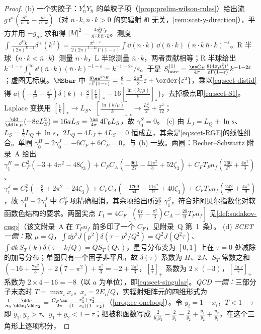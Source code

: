 \begin{proof}
(b) 一个实胶子：$Y_n^\dagger Y_{\bar n}$ 的单胶子项（\cref{prop:prelim-wilson-rules}）给出流 $g\,t^a(\frac{\bar n^\mu}{\bar n\cdot k}-\frac{n^\mu}{n\cdot k})$（对 $n\cdot k,\bar n\cdot k>0$ 的实辐射 $\ii0$ 无关，\cref{rem:scet-y-direction}），平方并用 $-g_{\mu\nu}$ 求和得 $|M|^2=\frac{4g_0^2C_F}{n\cdot k\,\bar n\cdot k}$。测度 $\int\frac{\dd^Dk}{(2\pi)^{D-1}}\delta^+(k^2)=\frac{\pi^{1-\varepsilon}}{2(2\pi)^{3-2\varepsilon}\Gamma(1-\varepsilon)}\int\dd(n\cdot k)\,\dd(\bar n\cdot k)\,(n\cdot k\,\bar n\cdot k)^{-\varepsilon}$。R 半球（$n\cdot k<\bar n\cdot k$）测量 $n\cdot k$，L 半球测量 $\bar n\cdot k$，两者贡献相等；R 半球给出 $k^{-1-\varepsilon}\int_k^\infty\dd(\bar n\cdot k)(\bar n\cdot k)^{-1-\varepsilon}=k^{-1-2\varepsilon}/\varepsilon$。于是 $S^{(1)}_{\rm bare}=\frac{\as C_F}{4\pi}\frac{8(4\pi\mu_0^2)^\varepsilon}{\varepsilon\Gamma(1-\varepsilon)}k^{-1-2\varepsilon}$；虚图无标度。$\MSbar$ 中 $\frac{8\ee^{\varepsilon\gamma_E}}{\varepsilon\Gamma(1-\varepsilon)}=\frac8\varepsilon-\frac{2\pi^2}{3}\varepsilon+\order{\varepsilon^2}$，乘以\cref{eq:scet-distid}得 $a\{(-\frac4{\varepsilon^2}+\frac{\pi^2}3)\delta(k)+\frac8\varepsilon[\frac1k]_*-16[\frac{\ln(k/\mu)}{k}]_*\}$，去掉极点即\cref{eq:scet-S1}。Laplace 变换用 $[\frac1k]_*\to L_S$、$[\frac{\ln(k/\mu)}k]_*\to\frac{L_S^2}2+\frac{\pi^2}{12}$；$\frac{\dd}{\dd\ln\mu}(-8aL_S^2)=16aL_S=\frac{\as}{4\pi}\,4\Gamma_0L_S$，故 $\gamma^S_0=0$。%
(c) 由 $L_J=L_Q+\ln s$、$L_S=\frac12L_Q+\ln s$，$2L_Q-4L_J+4L_S=0$ 恒成立，其余是\cref{eq:scet-RGE}的线性组合。单圈 $\gamma^H_0-2\gamma^J_0=-6C_F+6C_F=0$，与 (b) 一致。两圈：Becher--Schwartz 附录~A 给出\cite{BecherSchwartz2008}
$\gamma^H_1=C_F^2(-3+4\pi^2-48\zeta_3)+C_FC_A(-\frac{961}{27}-\frac{11\pi^2}{3}+52\zeta_3)+C_FT_Fn_f(\frac{260}{27}+\frac{4\pi^2}{3})$、$\gamma^J_1=C_F^2(-\frac32+2\pi^2-24\zeta_3)+C_FC_A(-\frac{1769}{54}-\frac{11\pi^2}{9}+40\zeta_3)+C_FT_Fn_f(\frac{242}{27}+\frac{4\pi^2}{9})$，故 $\gamma^H_1-2\gamma^J_1$ 中 $C_F^2$ 项精确相消，其余项给出所述 $\gamma^S_1$，符合非阿贝尔指数化对软函数色结构的要求。两圈尖点 $\Gamma_1=4C_F[(\frac{67}9-\frac{\pi^2}3)C_A-\frac{20}9T_Fn_f]$ 见\cref{def:sudakov-cusp}（该文附录~A 在 $T_Fn_f$ 前多印了一个 $C_F$，见附录~Q 第~1~条）。%
(d) \emph{SCET 一侧：}取 $\mu=Q$，$\int\dd p^2J(p^2)\delta(\tau-p^2/Q^2)=Q^2J(Q^2\tau)$、$\int\dd k\,S_T(k)\delta(\tau-k/Q)=QS_T(Q\tau)$，星号分布变为 $[0,1]$ 上在 $\tau=0$ 处减除的加号分布；单圈只有一个因子非平凡，故 $\delta(\tau)$ 系数为 $H$、$2J$、$S_T$ 常数之和 $(-16+\frac{7\pi^2}3)+2(7-\pi^2)+\frac{\pi^2}3=-2+\frac{2\pi^2}{3}$，$[\frac1\tau]_+$ 系数为 $2\times(-3)$，$[\frac{\ln\tau}\tau]_+$ 系数为 $2\times4-16=-8$（以 $a$ 为单位），即\cref{eq:scet-singular}。\emph{QCD 一侧：}三部分子末态时 $T=\max_ix_i$，$x_i=2E_i/Q$，实辐射矩阵元的四维形式为 $\frac1{\sigma_0}\frac{\dd\sigma}{\dd x_1\dd x_2}=\frac{C_F\as}{2\pi}\frac{x_1^2+x_2^2}{(1-x_1)(1-x_2)}$（\cref{prop:ee-oneloop}）。令 $y_i=1-x_i$，$T<1-\tau$ 即 $y_1,y_2>\tau$、$y_1+y_2<1-\tau$；把被积函数写成 $\frac{2}{y_1y_2}-\frac2{y_1}-\frac2{y_2}+\frac{y_1}{y_2}+\frac{y_2}{y_1}$，在这个三角形上逐项积分，

\end{proof}
